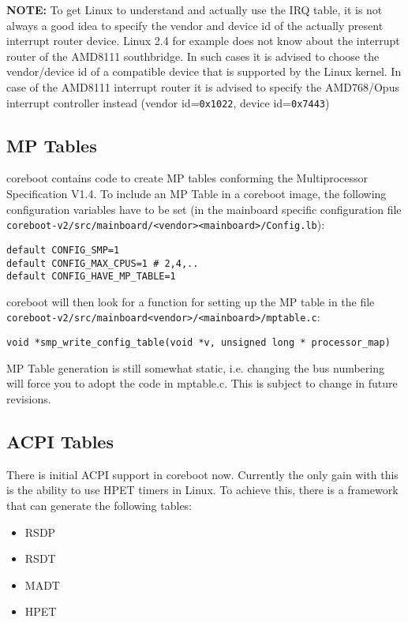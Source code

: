 \documentclass[titlepage,12pt]{article}
\begin{document}
\textbf{NOTE:} To get Linux to understand and actually use the IRQ
table, it is not always a good idea to specify the vendor and device id
of the actually present interrupt router device. Linux 2.4 for example
does not know about the interrupt router of the AMD8111 southbridge. In
such cases it is advised to choose the vendor/device id of a compatible
device that is supported by the Linux kernel. In case of the AMD8111
interrupt router it is advised to specify the AMD768/Opus interrupt
controller instead (vendor id=\texttt{0x1022}, device id=\texttt{0x7443})

\subsection {MP Tables}

coreboot contains code to create MP tables conforming the
Multiprocessor Specification V1.4. To include an MP Table in a coreboot
image, the following configuration variables have to be set (in the
mainboard specific configuration file
\texttt{coreboot-v2/src/mainboard/<vendor><mainboard>/Config.lb}):

\begin{verbatim}
default CONFIG_SMP=1
default CONFIG_MAX_CPUS=1 # 2,4,..
default CONFIG_HAVE_MP_TABLE=1
\end{verbatim}

coreboot will then look for a function for setting up the MP table in
the file \texttt{coreboot-v2/src/mainboard<vendor>/<mainboard>/mptable.c}:

\begin{verbatim}
void *smp_write_config_table(void *v, unsigned long * processor_map)
\end{verbatim}

MP Table generation is still somewhat static, i.e. changing the bus
numbering will force
you to adopt the code in mptable.c. This is subject to change in future
revisions.

\subsection {ACPI Tables}

There is initial ACPI support in coreboot now. Currently the only gain with
this is the ability to use HPET timers in Linux. To achieve this, there is a
framework that can generate the following tables:
\begin{itemize}
\item RSDP
\item RSDT
\item MADT
\item HPET
\end{itemize}
\end{document}
